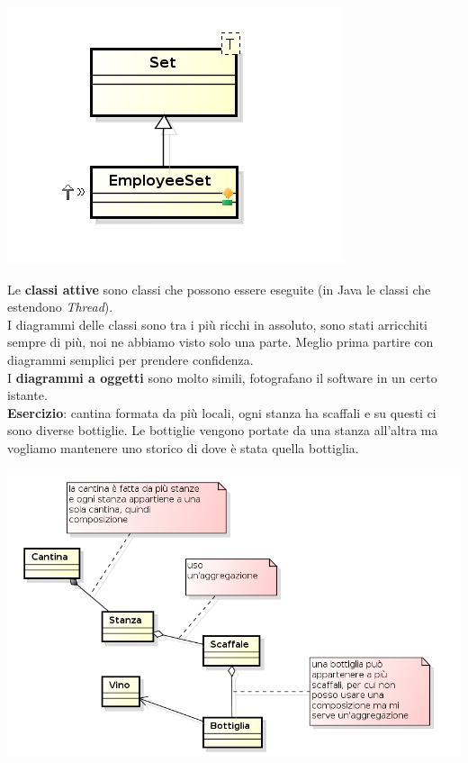 {\begin{center}
\includegraphics[width=0.75\columnwidth]{img2} %

\end{center}

Le \textbf{classi attive} sono classi che possono essere eseguite (in Java le classi che estendono \textit{Thread}).\\
I diagrammi delle classi sono tra i più ricchi in assoluto, sono stati arricchiti sempre di più, noi ne abbiamo visto solo una parte. Meglio prima partire con diagrammi semplici per prendere confidenza.\\
I \textbf{diagrammi a oggetti} sono molto simili, fotografano il software in un certo istante.\\
\textbf{Esercizio}: cantina formata da più locali, ogni stanza ha scaffali e su questi ci sono diverse bottiglie. Le bottiglie vengono portate da una stanza all'altra ma vogliamo mantenere uno storico di dove è stata quella bottiglia.

\begin{center}

\includegraphics[width=0.75\columnwidth]{img3} %

\end{center}

}
